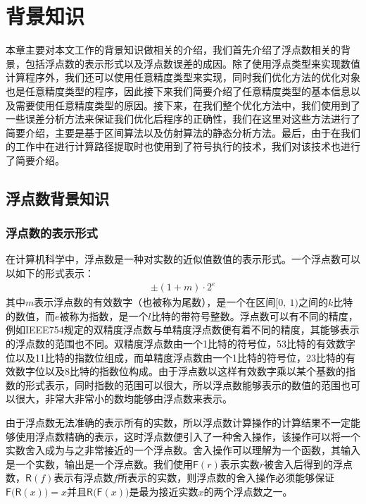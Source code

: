\chapter{背景知识}\label{chapter_background}

本章主要对本文工作的背景知识做相关的介绍，我们首先介绍了浮点数\cite{Rajaraman2016}相关的背景，包括浮点数的表示形式以及浮点数误差的成因。除了使用浮点类型来实现数值计算程序外，我们还可以使用任意精度类型\cite{MENISSIERMORAIN200513}来实现，同时我们优化方法的优化对象也是任意精度类型的程序，因此接下来我们简要介绍了任意精度类型的基本信息以及需要使用任意精度类型的原因。接下来，在我们整个优化方法中，我们使用到了一些误差分析方法来保证我们优化后程序的正确性，我们在这里对这些方法进行了简要介绍，主要是基于区间算法\cite{Hickey:2001:IAP:502102.502106}以及仿射算法\cite{deFigueiredo2004}的静态分析方法。最后，由于在我们的工作中在进行计算路径提取时也使用到了符号执行的技术，我们对该技术也进行了简要介绍。

\section{浮点数背景知识}

\subsection{浮点数的表示形式}

在计算机科学中，浮点数是一种对实数的近似值数值的表示形式。一个浮点数可以以如下的形式表示：
\begin{gather*}
    \pm (1+m) \cdot 2^e
\end{gather*}
其中$m$表示浮点数的有效数字（也被称为尾数），是一个在区间$[ 0 ,\ 1 )$之间的$k$比特的数值，而$e$被称为指数，是一个$l$比特的带符号整数。浮点数可以有不同的精度，例如IEEE754\cite{1985--ieee754}规定的双精度浮点数与单精度浮点数便有着不同的精度，其能够表示的浮点数的范围也不同。双精度浮点数由一个1比特的符号位，53比特的有效数字位以及11比特的指数位组成，而单精度浮点数由一个1比特的符号位，23比特的有效数字位以及8比特的指数位构成。由于浮点数以这样有效数字乘以某个基数的指数的形式表示，同时指数的范围可以很大，所以浮点数能够表示的数值的范围也可以很大，非常大非常小的数均能够由浮点数来表示。

由于浮点数无法准确的表示所有的实数，所以浮点数计算操作的计算结果不一定能够使用浮点数精确的表示，这时浮点数便引入了一种舍入操作，该操作可以将一个实数舍入成为与之非常接近的一个浮点数。舍入操作可以理解为一个函数，其输入是一个实数，输出是一个浮点数。我们使用$\mathsf{F}(r)$表示实数$r$被舍入后得到的浮点数，$\mathsf{R}(f)$表示有浮点数$f$所表示的实数，则浮点数的舍入操作必须能够保证$\mathsf{F(R}(x)) = x $并且$\mathsf{R(F}(x))$是最为接近实数$x$的两个浮点数之一。

